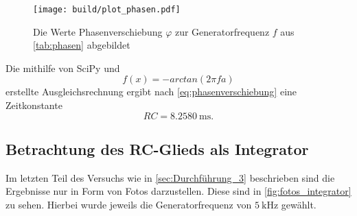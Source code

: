 \begin{figure}
    \centering
    \texttt{[image: build/plot\_phasen.pdf]}
    \caption{Die Werte Phasenverschiebung $\varphi$ zur Generatorfrequenz $f$ aus \autoref{tab:phasen} abgebildet}
    \label{fig:plot_phasen}
\end{figure}

Die mithilfe von SciPy\cite{scipy} und
\begin{equation}
    f(x)=-arctan(2\pi f a)
\end{equation}
erstellte Ausgleichsrechnung ergibt nach \autoref{eq:phasenverschiebung} eine Zeitkonstante
\begin{equation}
    RC = \SI{8.2580}{\milli\second}.
\end{equation}

\subsection{Betrachtung des RC-Glieds als Integrator}
\label{sec:Auswertung_Integrator}

Im letzten Teil des Versuchs wie in \autoref{sec:Durchführung_3} beschrieben sind die Ergebnisse nur in Form von Fotos darzustellen. Diese sind in \autoref{fig:fotos_integrator} zu sehen. Hierbei wurde jeweils die Generatorfrequenz von $\SI{5}{\kilo\hertz}$ gewählt.

